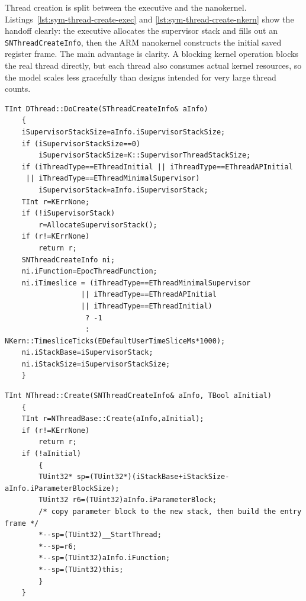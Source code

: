 Thread creation is split between the executive and the nanokernel.
Listings~\ref{lst:sym-thread-create-exec} and
\ref{lst:sym-thread-create-nkern} show the handoff clearly: the executive
allocates the supervisor stack and fills out an \texttt{SNThreadCreateInfo},
then the ARM nanokernel constructs the initial saved register frame. The main
advantage is clarity. A blocking kernel operation blocks the real thread
directly, but each thread also consumes actual kernel resources, so the model
scales less gracefully than designs intended for very large thread counts.

\begin{listing}[H]
\begin{verbatim}
TInt DThread::DoCreate(SThreadCreateInfo& aInfo)
	{
	iSupervisorStackSize=aInfo.iSupervisorStackSize;
	if (iSupervisorStackSize==0)
		iSupervisorStackSize=K::SupervisorThreadStackSize;
	if (iThreadType==EThreadInitial || iThreadType==EThreadAPInitial
	 || iThreadType==EThreadMinimalSupervisor)
		iSupervisorStack=aInfo.iSupervisorStack;
	TInt r=KErrNone;
	if (!iSupervisorStack)
		r=AllocateSupervisorStack();
	if (r!=KErrNone)
		return r;
	SNThreadCreateInfo ni;
	ni.iFunction=EpocThreadFunction;
	ni.iTimeslice = (iThreadType==EThreadMinimalSupervisor
	              || iThreadType==EThreadAPInitial
	              || iThreadType==EThreadInitial)
	               ? -1
	               : NKern::TimesliceTicks(EDefaultUserTimeSliceMs*1000);
	ni.iStackBase=iSupervisorStack;
	ni.iStackSize=iSupervisorStackSize;
	}
\end{verbatim}
\caption{Executive-side thread setup. File: \texttt{sthread.cpp}.}
\label{lst:sym-thread-create-exec}
\end{listing}

\begin{listing}[H]
\begin{verbatim}
TInt NThread::Create(SNThreadCreateInfo& aInfo, TBool aInitial)
	{
	TInt r=NThreadBase::Create(aInfo,aInitial);
	if (r!=KErrNone)
		return r;
	if (!aInitial)
		{
		TUint32* sp=(TUint32*)(iStackBase+iStackSize-aInfo.iParameterBlockSize);
		TUint32 r6=(TUint32)aInfo.iParameterBlock;
		/* copy parameter block to the new stack, then build the entry frame */
		*--sp=(TUint32)__StartThread;
		*--sp=r6;
		*--sp=(TUint32)aInfo.iFunction;
		*--sp=(TUint32)this;
		}
	}
\end{verbatim}
\caption{Nanokernel thread bootstrap frame construction. File:
\texttt{arm/ncthrd.cpp}.}
\label{lst:sym-thread-create-nkern}
\end{listing}

